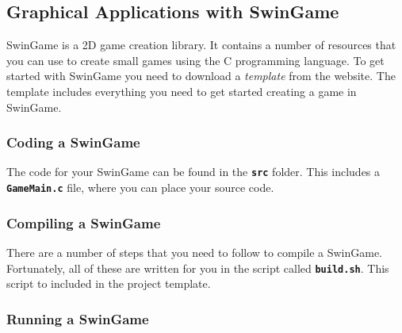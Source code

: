 \clearpage
\subsection{Graphical Applications with SwinGame} %
\label{sub:graphical_applications_with_swingame}

SwinGame is a 2D game creation library. It contains a number of resources that you can use to create small games using the C programming language. To get started with SwinGame you need to download a \emph{template} from the website. The template includes everything you need to get started creating a game in SwinGame.

\subsubsection{Coding a SwinGame} %
\label{ssub:coding_a_swingame}

The code for your SwinGame can be found in the \textbf{\texttt{src}} folder. This includes a \texttt{\textbf{GameMain.c}} file, where you can place your source code.


\subsubsection{Compiling a SwinGame} %
\label{ssub:compiling_a_swingame}

There are a number of steps that you need to follow to compile a SwinGame. Fortunately, all of these are written for you in the script called \textbf{\texttt{build.sh}}. This script to included in the project template. 


\subsubsection{Running a SwinGame} %
\label{ssub:running_a_swingame}


